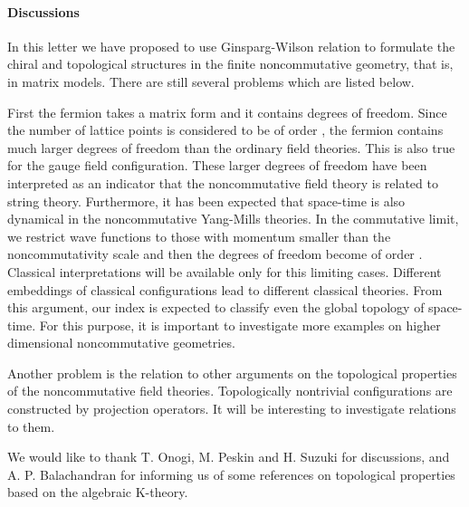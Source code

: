 \documentclass[a4paper,prl,showpacs,twocolumn]{revtex4}
\begin{document}
\paragraph{{\bf Discussions}}
In this letter we have proposed to use Ginsparg-Wilson 
relation to formulate the chiral and topological structures
in the finite noncommutative geometry, that is, in 
matrix models.
There are still several problems which are listed below.
\par
First the fermion takes a matrix form
and  it contains \coordHE{} degrees of freedom.
Since the number of lattice points is
considered to be of order \coordHE{}, the fermion contains
much larger degrees of freedom than the ordinary field theories.
This is also true for the gauge field configuration.
These larger degrees of freedom have been interpreted 
as an indicator that the noncommutative field theory is 
related to string theory\cite{NCYM}. Furthermore, it has been
expected that space-time is also dynamical in the
noncommutative Yang-Mills theories.
In the commutative limit, 
we restrict wave functions to those with momentum smaller than
the noncommutativity scale and then the degrees of freedom
become of order \coordHE{}. 
Classical interpretations will be available only for this 
limiting cases.
Different embeddings of classical configurations
lead to different classical theories.
From this argument, our index is expected to classify 
even the global topology of space-time.
For this purpose,
it is important to investigate more examples on higher
dimensional noncommutative geometries.
\par
Another problem is the relation to  other arguments
on the topological properties of the noncommutative field 
theories\cite{Connes,harvey,balatop}. 
Topologically nontrivial configurations are constructed 
by projection operators. 
It will be interesting to investigate relations to them.
\par
We would like to thank T. Onogi, M. Peskin and H. Suzuki 
for discussions, and A. P. Balachandran for informing us 
of some references on topological properties based on the 
algebraic K-theory.
\end{document}
